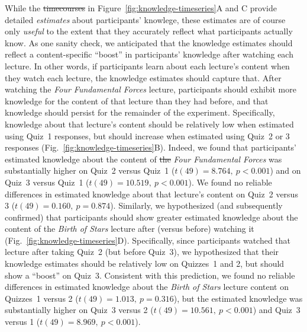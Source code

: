 \documentclass[10pt]{article}
\providecommand{\DIFaddtex}[1]{{\protect\color{blue}\uwave{#1}}} %
\providecommand{\DIFdeltex}[1]{{\protect\color{red}\sout{#1}}}                      %
\providecommand{\DIFaddbegin}{} %
\providecommand{\DIFaddend}{} %
\providecommand{\DIFdelbegin}{} %
\providecommand{\DIFdelend}{} %
\providecommand{\DIFadd}[1]{\texorpdfstring{\DIFaddtex{#1}}{#1}} %
\providecommand{\DIFdel}[1]{\texorpdfstring{\DIFdeltex{#1}}{}} %
\newcommand{\DIFscaledelfig}{0.5}
\newlength{\DIFdelgraphicswidth} %
\newlength{\DIFdelgraphicsheight} %
\newcommand{\DIFaddincludegraphics}[2][]{{\color{blue}\fbox{\DIFOincludegraphics[#1]{#2}}}} %
\newcommand{\DIFdelincludegraphics}[2][]{%
\sbox{\DIFdelgraphicsbox}{\DIFOincludegraphics[#1]{#2}}%
\settoboxwidth{\DIFdelgraphicswidth}{\DIFdelgraphicsbox} %
\settoboxtotalheight{\DIFdelgraphicsheight}{\DIFdelgraphicsbox} %
\scalebox{\DIFscaledelfig}{%
\parbox[b]{\DIFdelgraphicswidth}{\usebox{\DIFdelgraphicsbox}\\[-\baselineskip] \rule{\DIFdelgraphicswidth}{0em}}\llap{\resizebox{\DIFdelgraphicswidth}{\DIFdelgraphicsheight}{%
\setlength{\unitlength}{\DIFdelgraphicswidth}%
\begin{picture}(1,1)%
\thicklines\linethickness{2pt} %
{\color[rgb]{1,0,0}\put(0,0){\framebox(1,1){}}}%
{\color[rgb]{1,0,0}\put(0,0){\line( 1,1){1}}}%
{\color[rgb]{1,0,0}\put(0,1){\line(1,-1){1}}}%
\end{picture}%
}\hspace*{3pt}}} %
} %
\DeclareRobustCommand{\DIFaddbegin}{\DIFOaddbegin \let\includegraphics\DIFaddincludegraphics} %
\DeclareRobustCommand{\DIFaddend}{\DIFOaddend \let\includegraphics\DIFOincludegraphics} %
\DeclareRobustCommand{\DIFdelbegin}{\DIFOdelbegin \let\includegraphics\DIFdelincludegraphics} %
\DeclareRobustCommand{\DIFdelend}{\DIFOaddend \let\includegraphics\DIFOincludegraphics} %
\begin{document}
While the \DIFdelbegin \DIFdel{timecourses }\DIFdelend \DIFaddbegin \DIFadd{time courses }\DIFaddend in Figure~\ref{fig:knowledge-timeseries}A and C provide
detailed \textit{estimates} about participants' knowlege, these estimates are
of course only \textit{useful} to the extent that they accurately reflect what
participants actually know. As one sanity check, we anticipated that the
knowledge estimates should reflect a content-specific ``boost'' in
participants' knowledge after watching each lecture. In other words, if
participants learn about each lecture's content when they watch each lecture,
the knowledge estimates should capture that. After watching the \textit{Four
Fundamental Forces} lecture, participants should exhibit more knowledge for the
content of that lecture than they had before, and that knowledge should persist
for the remainder of the experiment. Specifically, knowledge about that
lecture's content should be relatively low when estimated using Quiz~1
responses, but should increase when estimated using Quiz~2 or 3 responses
(Fig.~\ref{fig:knowledge-timeseries}B). Indeed, we found that participants'
estimated knowledge about the content of \DIFdelbegin \DIFdel{the }\DIFdelend \textit{Four Fundamental Forces}
was substantially higher on Quiz~2 versus Quiz~1 ($t(49) = 8.764,~p < 0.001$)
and on Quiz~3 versus Quiz~1 ($t(49) = 10.519,~p < 0.001$). We found no reliable
differences in estimated knowledge about that lecture's content on Quiz~2
versus 3 ($t(49) = 0.160,~p = 0.874$). Similarly, we hypothesized (and
subsequently confirmed) that participants should show greater estimated
knowledge about the content of the \textit{Birth of Stars} lecture after
(versus before) watching it (Fig.~\ref{fig:knowledge-timeseries}D).
Specifically, since participants watched that lecture after taking Quiz~2 (but
before Quiz~3), we hypothesized that their knowledge estimates should be
relatively low on Quizzes~1 and 2, but should show a ``boost'' on Quiz~3.
Consistent with this prediction, we found no reliable differences in estimated
knowledge about the \textit{Birth of Stars} lecture content on Quizzes~1 versus
2 ($t(49) = 1.013,~p = 0.316$), but the estimated knowledge was substantially
higher on Quiz~3 versus 2 ($t(49) = 10.561,~p < 0.001$) and Quiz~3 versus 1
($t(49) = 8.969,~p < 0.001$).
\end{document}
